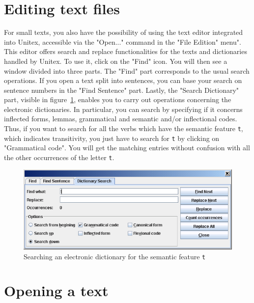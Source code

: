 \section{Editing text files}
For small texts, you also have the possibility of using the text editor integrated into Unitex,
accessible via the "Open..." command in the "File Edition" menu".
 This editor offers search and replace
functionalities  for the texts and dictionaries handled by Unitex. To use it,
click on the "Find" icon. You will then see a window  divided into three parts.
The "Find" part corresponds to the usual search operations. If you open a text
split into sentences, you can base your search on sentence numbers 
in the "Find Sentence" part. Lastly, the "Search Dictionary" part,
visible in figure~\ref{dictionary-search}, enables you to carry out operations
concerning the electronic dictionaries. In particular, you can   search by
specifying if it concerns  inflected forms, lemmas, grammatical and semantic
and/or inflectional codes. Thus, if you want to search for all the verbs which
have the  semantic feature \verb$t$, which indicates
transitivity, you just have to search for  \verb$t$ by clicking on "Grammatical
code". You will get the matching entries without confusion  with all the other
occurrences of the letter \verb$t$.


\begin{figure}[!h]
\begin{center}
\includegraphics[width=15cm]{resources/img/fig2-6.png}
\caption{Searching an electronic dictionary for the semantic feature \texttt{t}\label{dictionary-search}}
\end{center}
\end{figure}


\section{Opening a text}

